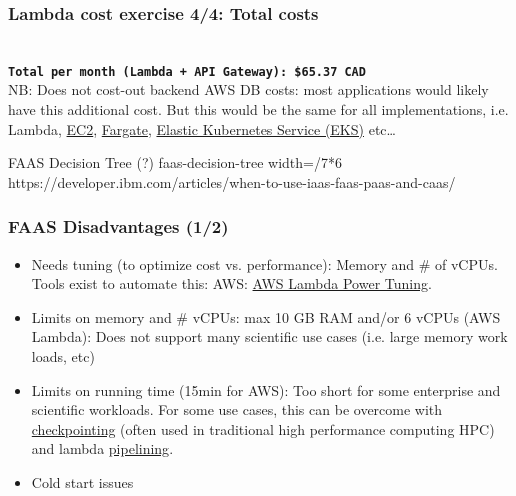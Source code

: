 \documentclass[11pt,aspectratio=169]{beamer}
\begin{document}
        \begin{nrcanFrame}
  \frametitle{Lambda cost exercise 4/4: Total costs}
    \ \\ \vspace{1mm}
\texttt{\textbf{Total per month (Lambda + API Gateway): \$65.37 CAD}}
\ \\
\vspace{1cm}
    { \alert{NB: Does not cost-out backend AWS DB costs: most applications
        would likely have this additional cost. But this would be the same for all
        implementations, i.e. Lambda,
        \href{https://aws.amazon.com/ec2/}{EC2},
        \href{https://aws.amazon.com/fargate/?c=ser&sec=srv}{Fargate},
        \href{https://aws.amazon.com/eks/?pg=ln&sec=hiw}{Elastic Kubernetes
          Service (EKS)} etc\ldots
      }
    }
\end{nrcanFrame}

\nrcanGraphicFrame
  {FAAS Decision Tree (?)}
  {faas-decision-tree}
  {width=\paperwidth/7*6}
  {https://developer.ibm.com/articles/when-to-use-iaas-faas-paas-and-caas/}


\begin{nrcanFrame}
  \frametitle{FAAS Disadvantages (1/2)}
    \begin{itemize}
    \item Needs tuning (to optimize cost vs. performance): Memory and \# of vCPUs.
      Tools exist to automate this: AWS: \href{https://docs.aws.amazon.com/lambda/latest/operatorguide/profile-functions.html}{AWS Lambda Power Tuning}.
  \item Limits on memory and \# vCPUs: max 10 GB RAM and/or 6 vCPUs (AWS
    Lambda): Does not support many scientific use cases (i.e. large
    memory work loads, etc)
  \item Limits on running time (15min for AWS): Too short for some enterprise and scientific workloads.
    For some use cases, this can be overcome with \href{https://en.wikipedia.org/wiki/Application\_checkpointing}{checkpointing} (often used in traditional high performance computing HPC) and lambda \href{https://en.wikipedia.org/wiki/Pipeline\_(software)}{pipelining}.
  \item Cold start issues
    \end{itemize}
\end{nrcanFrame}
\end{document}
